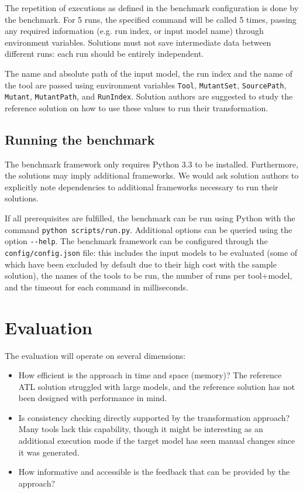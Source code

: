 \documentclass[a4paper]{scrartcl}
\newcommand*{\file}[1]{\texttt{#1}}
\begin{document}
The repetition of executions as defined in the benchmark configuration is done
by the benchmark. For 5 runs, the specified command will be called 5 times,
passing any required information (e.g. run index, or input model name) through
environment variables. Solutions must not save intermediate data between
different runs: each run should be entirely independent.

The name and absolute path of the input model, the run index and the name of the
tool are passed using environment variables \file{Tool}, \file{MutantSet},
\file{SourcePath}, \file{Mutant}, \file{MutantPath}, and \file{RunIndex}.
Solution authors are suggested to study the reference solution on how to use
these values to run their transformation.

\subsection{Running the benchmark}
\label{sec:running-benchmark}

The benchmark framework only requires Python 3.3 to be installed. Furthermore,
the solutions may imply additional frameworks. We would ask solution authors to
explicitly note dependencies to additional frameworks necessary to run their
solutions.

If all prerequisites are fulfilled, the benchmark can be run using Python with
the command \file{python scripts/run.py}. Additional options can be queried
using the option \file{{-}{-}help}. The benchmark framework can be configured
through the \file{config/config.json} file: this includes the input models to be
evaluated (some of which have been excluded by default due to their high cost
with the sample solution), the names of the tools to be run, the number of runs
per tool+model, and the timeout for each command in milliseconds.

\section{Evaluation}
\label{sec:evaluation}

The evaluation will operate on several dimensions:

\begin{itemize}
\item How efficient is the approach in time and space (memory)? The reference
  ATL solution struggled with large models, and the reference solution has not
  been designed with performance in mind.

\item Is consistency checking directly supported by the transformation approach?
  Many tools lack this capability, though it might be interesting as an
  additional execution mode if the target model has seen manual changes since it
  was generated.

\item How informative and accessible is the feedback that can be provided by the
  approach?
\end{itemize}



\end{document}
